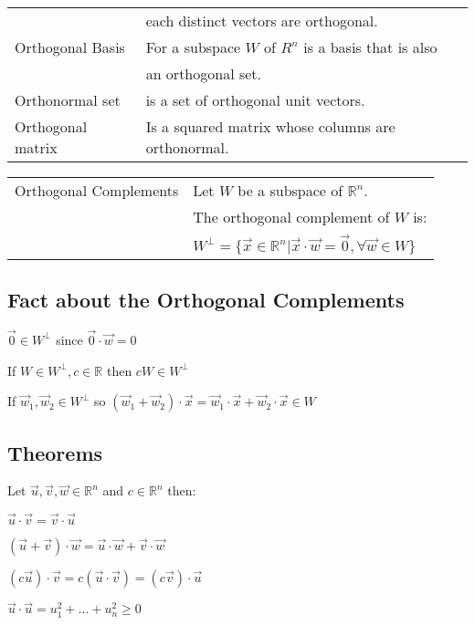 \documentclass[5pt]{article}
\begin{document}
\begin{multicols}{2}
\begin{tabular}{ll}
                      & each distinct vectors are orthogonal.\\
Orthogonal Basis      & For a subspace $W$ of $R^n$ is a basis that is also\\
                      & an orthogonal set.\\
Orthonormal set       & is a set  of  orthogonal unit vectors.\\
Orthogonal matrix     & Is a squared matrix whose columns are orthonormal.
\end{tabular}
\begin{tabular}{ll}                      
Orthogonal Complements  & Let $W$ be a subspace of $\mathbb{R}^n$.\\
                        & The orthogonal complement of $W$ is: \\
                        & $W^\perp=\{\vec{x}\in\mathbb{R}^n|\vec{x}\cdot\vec{w}=\vec{0}, \forall\vec{w}\in W\}$
\end{tabular}

\subsection{Fact about the Orthogonal Complements}
\begin{itemize*}
  \item $\vec{0}\in W^\perp$ since $\vec{0}\cdot\vec{w}=0$
  \item If $W\in W^\perp, c\in \mathbb{R}$ then $cW\in W^\perp$
  \item If $\vec{w}_1,\vec{w}_2\in W^\perp$ so $(\vec{w}_1+\vec{w}_2)\cdot\vec{x}=\vec{w}_1\cdot\vec{x}+\vec{w}_2\cdot\vec{x}\in W$
\end{itemize*}

\subsection{Theorems}
\begin{properties}
  Let $\vec{u},\vec{v},\vec{w} \in \mathbb{R}^n$ and $c\in \mathbb{R}^n$ then:\\
  \begin{itemize*}
    \item $\vec{u}\cdot\vec{v}=\vec{v}\cdot\vec{u}$ 
    \item $(\vec{u}+\vec{v})\cdot \vec{w}=\vec{u}\cdot\vec{w}+\vec{v}\cdot \vec{w}$
    \item $(c\vec{u})\cdot \vec{v}=c(\vec{u}\cdot \vec{v})=(c\vec{v})\cdot \vec{u}$
    \item $\vec{u}\cdot \vec{u}=u_1^2+...+u^2_n\geq 0$
  \end{itemize*}
\end{properties}


\end{multicols}
\end{document}
